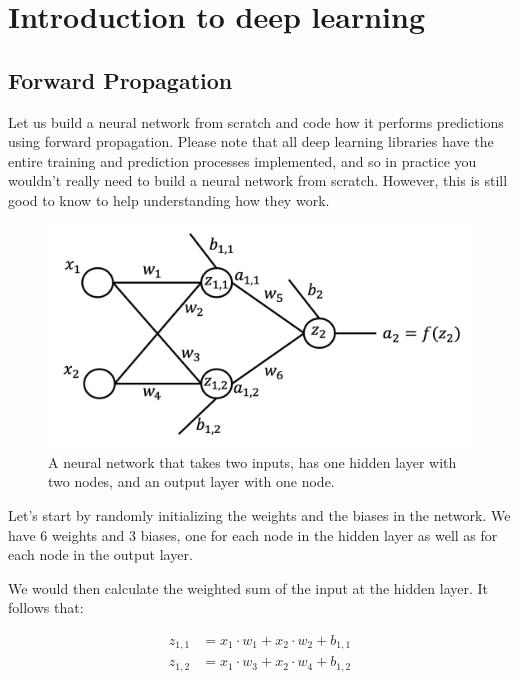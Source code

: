 \chapter{Introduction to deep learning}
\section{Forward Propagation}
Let us build a neural network from scratch and code how it performs predictions using forward propagation. Please note that all deep learning libraries have the entire training and prediction processes implemented, and so in practice you wouldn't really need to build a neural network from scratch. However, this is still good to know to help understanding how they work.

\begin{figure}[htp]
	\centering
	\includegraphics[width=\linewidth]{Assets/neural_network_example}
	\caption{A neural network that takes two inputs, has one hidden layer with two nodes, and an output layer with one node.}
	\label{fig:neural network}
\end{figure}

\noindent Let's start by randomly initializing the weights and the biases in the network. We have 6 weights and 3 biases, one for each node in the hidden layer as well as for each node in the output layer.

\noindent We would then calculate the weighted sum of the input at the hidden layer. It follows that:

\begin{equation} \label{weighted sum}
	\begin{split}
		z_{1,1} & = x_1 \cdot w_1 + x_2 \cdot w_2 + b_{1,1}\\
		z_{1,2} & = x_1 \cdot w_3 + x_2 \cdot w_4 + b_{1,2}
	\end{split}
\end{equation}

